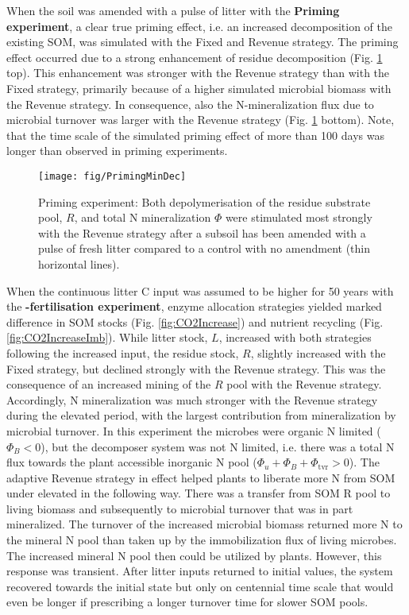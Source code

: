 When the soil was amended with a pulse of litter with the \textbf{Priming
experiment}, a clear true priming effect, i.e. an increased decomposition of the
existing SOM, was simulated with the Fixed and Revenue strategy.
The priming effect occurred due to a strong enhancement of residue decomposition
(Fig. \ref{fig:PrimingMinDec} top). This enhancement was stronger with the
Revenue strategy than with the Fixed strategy, primarily because of a higher
simulated microbial biomass with the Revenue strategy. In consequence, also the
N-mineralization flux due to microbial turnover was larger with the Revenue
strategy (Fig. \ref{fig:PrimingMinDec} bottom).
Note, that the time scale of the simulated priming effect of more than 100 days
was longer than observed in priming experiments.

\begin{figure}[t] \vspace*{2mm}
\begin{center}
\texttt{[image: fig/PrimingMinDec]}
\end{center}
\caption{
Priming experiment: Both depolymerisation of the residue substrate pool, $R$,
and total N mineralization $\Phi$ were stimulated most strongly with the Revenue strategy
after a subsoil has been amended with a pulse of fresh litter 
compared to a control with no amendment (thin horizontal lines).
\label{fig:PrimingMinDec}}
\end{figure}

When the continuous litter C input was assumed to be higher for 50 years with
the \textbf{-fertilisation experiment}, enzyme allocation strategies
yielded marked difference in SOM stocks (Fig. \ref{fig:CO2Increase}) and
nutrient recycling (Fig. \ref{fig:CO2IncreaseImb}).
While litter stock, $L$, increased with both strategies following the increased
input, the residue stock, $R$, slightly increased with the Fixed strategy, but
declined strongly with the Revenue strategy. This was the consequence of an
increased mining of the $R$ pool with the Revenue strategy. Accordingly, N
mineralization was much stronger with the Revenue strategy during the elevated
 period, with the largest contribution from mineralization by
microbial turnover. In this experiment the microbes were organic N limited
($\Phi_B < 0$), but the decomposer system was not N limited, i.e. there was a
total N flux towards the plant accessible inorganic N pool ($\Phi_u + \Phi_B +
\Phi_{\operatorname{tvr}} > 0$). The adaptive Revenue strategy in effect helped
plants to liberate more N from SOM under elevated  in the following
way. There was a transfer from SOM R pool to living biomass and subsequently to
microbial turnover that was in part mineralized. The turnover of the increased
microbial biomass returned more N to the mineral N pool than taken up by
the immobilization flux of living microbes. The increased mineral N pool
then could be utilized by plants.
However, this response was transient. After litter inputs returned to initial
values, the system recovered towards the initial state but only on centennial
time scale that would even be longer if prescribing a longer turnover time for
slower SOM pools.

